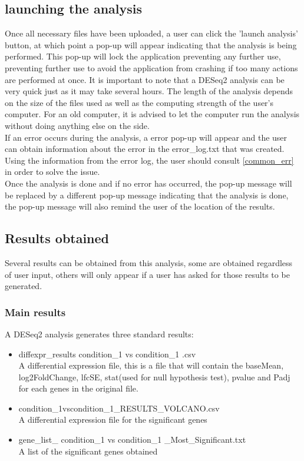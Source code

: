 \documentclass[11pt]{article}
\begin{document}
\subsection{launching the analysis}
Once all necessary files have been uploaded, a user can click the 'launch analysis' button, at which point a pop-up will appear indicating that the analysis is being performed. This pop-up will lock the application preventing any further use, preventing further use to avoid the application from crashing if too many actions are performed at once.
It is important to note that a \acrshort{DESeq2} analysis can be very quick just as it may take several hours. The length of the analysis depends on the size of the files used as well as the computing strength of the user's computer. For an old computer, it is advised to let the computer run the analysis without doing anything else on the side.\\
If an error occurs during the analysis, a error pop-up will appear and the user can obtain information about the error in the error\_log.txt that was created. Using the information from the error log, the user should consult \autoref{common_err} in order to solve the issue.\\
Once the analysis is done and if no error has occurred, the pop-up message will be replaced by a different pop-up message indicating that the analysis is done, the pop-up message will also remind the user of the location of the results.
\subsection{Results obtained}
Several results can be obtained from this analysis, some are obtained regardless of user input, others will only appear if a user has asked for those results to be generated.
\subsubsection{Main results}
A \acrshort{DESeq2} analysis generates three standard results:
\begin{itemize}
\item diffexpr\_results condition\_1 vs condition\_1 .csv\\
A differential expression file, this is a file that will contain the baseMean, log2FoldChange, \acrshort{lfcSE}, stat(used for null hypothesis test), pvalue and \acrshort{Padj} for each genes in the original file.
\item condition\_1vscondition\_1\_RESULTS\_VOLCANO.csv\\
A differential expression file for the significant genes
\item gene\_list\_ condition\_1 vs condition\_1 \_Most\_Significant.txt\\
A list of the significant genes obtained
\end{itemize}
\end{document}
